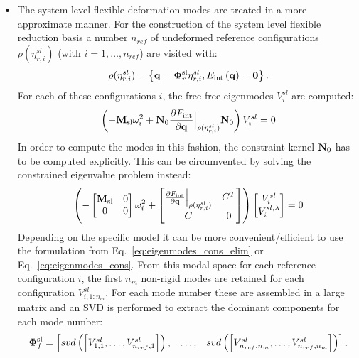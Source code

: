 \begin{itemize}
\item The system level flexible deformation modes are treated in a more approximate manner. For the construction of the system level flexible reduction basis a number $n_{ref}$ of undeformed reference configurations $\rho(\eta^{sl}_{r,i})$ (with $i=1,\ldots,n_{ref}$) are visited with:
\begin{equation}
\rho(\eta^{sl}_{r,i}) = \left\{\mathbf q=\bm \Phi^{\rm sl}_r \eta^{sl}_{r,i} , E_{\mathrm{int}}\left(\mathbf q\right) = \mathbf{0} \right\}.
\end{equation}
For each of these configurations $i$, the free-free eigenmodes $V^{sl}_i$ are computed:
\begin{equation}
\left(-\mathbf M_{\rm sl}\omega_i^2 + \mathbf N_0 \frac{\partial F_{\mathrm{int}}}{\partial \mathbf q}\Bigr|_{\rho(\eta^{sl}_{r,i})}\mathbf N_0\right)V^{sl}_i = 0
\label{eq:eigenmodes_cons_elim}
\end{equation}
In order to compute the modes in this fashion, the constraint kernel $\mathbf N_0$ has to be computed explicitly. This can be circumvented by solving the constrained eigenvalue problem instead:
\begin{equation}
\left(-\begin{bmatrix}\mathbf M_{\rm sl} & 0 \\ 0 & 0\end{bmatrix}\omega_i^2 
+ \begin{bmatrix}\frac{\partial F_{\mathrm{int}}}{\partial \mathbf q}\Bigr|_{\rho(\eta^{sl}_{r,i})} & C^T \\ C & 0 \end{bmatrix}
\right)\begin{bmatrix} V^{sl}_i \\ V^{sl,\lambda}_i \end{bmatrix} = 0
\label{eq:eigenmodes_cons}
\end{equation}
Depending on the specific model it can be more convenient/efficient to use the formulation from Eq.~\eqref{eq:eigenmodes_cons_elim} or Eq.~\eqref{eq:eigenmodes_cons}. 
From this modal space for each reference configuration $i$, the first $n_m$ non-rigid modes are retained for each configuration $V^{sl}_{i,1:n_m}$. 
For each mode number these are assembled in a large matrix and an SVD is performed to extract the dominant components for each mode number:
\begin{equation}
\phisl_f = \begin{bmatrix} svd\left(\left[V^{sl}_{1,1},\ldots,V^{sl}_{n_{ref},1}\right]\right), & \ldots, & svd\left(\left[V^{sl}_{n_{ref},n_m},\ldots,V^{sl}_{n_{ref},n_m}\right]\right) \end{bmatrix}.

\end{equation}
\end{itemize}

